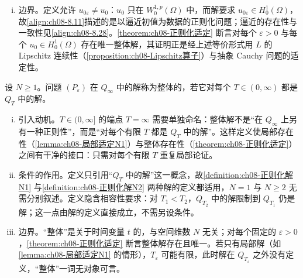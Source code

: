 \documentclass[../../main.tex]{subfiles}%
\begin{document}
\begin{remark}
\begin{enumerate}[(i)]
\item 边界。定义允许 $u_{0\varepsilon}\neq u_0$：$u_0$ 只在 $W^{1,p}_0(\Omega)$ 中，而解要求 $u_{0\varepsilon}\in H^1_0(\Omega)$，故\eqref{align:ch08-8.11}描述的是以逼近初值为数据的正则化问题；逼近的存在性与一致性见\eqref{align:ch08-8.28}。\cref{theorem:ch08-正则化适定} 断言对每个 $\varepsilon>0$ 与每个 $u_0\in H^1_0(\Omega)$ 存在唯一整体解，其证明正是经上述等价形式用 $L$ 的 Lipschitz 连续性（\cref{proposition:ch08-Lipschitz算子}）与抽象 Cauchy 问题的适定性。
\end{enumerate}
\end{remark}

\begin{definition}[整体解]\label{definition:ch08-整体解}
设 $N\geqslant1$。问题 $(P_\varepsilon)$ 在 $Q_\infty$ 中的解称为整体的，若它对每个 $T\in(0,\infty)$ 都是 $Q_T$ 中的解。
\end{definition}

\begin{remark}\label{remark:ch08-整体解}
\begin{enumerate}[(i)]
\item 引入动机。$T\in(0,\infty]$ 的端点 $T=\infty$ 需要单独命名：整体解不是“在 $Q_\infty$ 上另有一种正则性”，而是“对每个有限 $T$ 都是 $Q_T$ 中的解”。这样定义使局部存在性（\cref{lemma:ch08-局部适定N1}）与整体存在性（\cref{theorem:ch08-正则化适定}）之间有干净的接口：只需对每个有限 $T$ 重复局部论证。
\item 条件的作用。定义只引用“$Q_T$ 中的解”这一概念，故\cref{definition:ch08-正则化解N1} 与\cref{definition:ch08-正则化解N2} 两种解的定义都适用，$N=1$ 与 $N\geqslant2$ 无需分别叙述。定义隐含相容性要求：对 $T_1<T_2$，$Q_{T_2}$ 中的解限制到 $Q_{T_1}$ 仍是解；这一点由解的定义直接成立，不需另设条件。
\item 边界。“整体”是关于时间变量 $t$ 的，与空间维数 $N$ 无关；对每个固定的 $\varepsilon>0$，\cref{theorem:ch08-正则化适定} 断言整体解存在且唯一。若只有局部解（如\cref{lemma:ch08-局部适定N1} 的情形），$T_\varepsilon$ 可能有限，此时解在 $Q_{T_\varepsilon}$ 之外没有定义，“整体”一词无对象可言。
\end{enumerate}
\end{remark}
\end{document}
